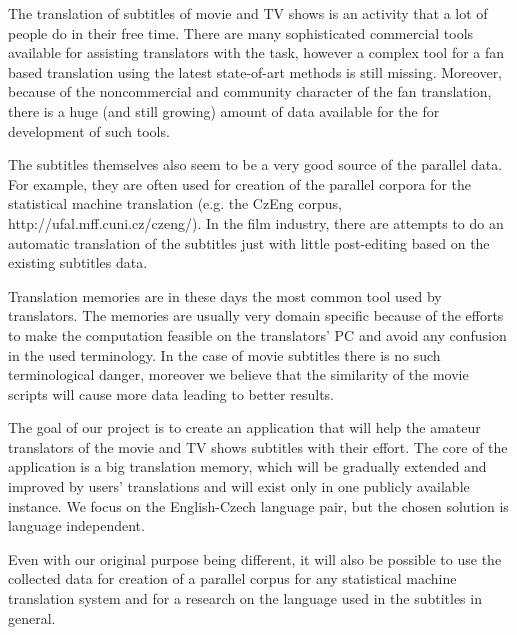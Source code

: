 
The translation of subtitles of movie and TV shows is an activity that a lot of people do in their free time. %
There are many sophisticated commercial tools available for assisting translators with the task, however a complex tool for a fan based translation using the latest state-of-art methods is still missing. 
Moreover, because of the noncommercial and community character of the fan translation, there is a huge (and still growing) amount of data available for the for development of such tools.

The subtitles themselves also seem to be a very good source of the parallel data. %
For example, they are often used for creation of the parallel corpora for the statistical machine translation (e.g. the CzEng corpus, http://ufal.mff.cuni.cz/czeng/).%
In the film industry, there are attempts to do an automatic translation of the subtitles just with little post-editing based on the existing subtitles data. %

Translation memories are in these days the most common tool used by translators. %
The memories are usually very domain specific because of the efforts to make the computation feasible on the translators' PC and avoid any confusion in the used terminology. 
In the case of movie subtitles there is no such terminological danger, moreover we believe that the similarity of the movie scripts will cause more data  leading to better results.

The goal of our project is to create an application that will help the amateur translators of the movie and TV shows subtitles with their effort.
The core of the application is a big translation memory, which will be gradually extended and improved by users' translations and will exist only in one publicly available instance. We focus on the English-Czech language pair, but the chosen solution is language independent. %


Even with our original purpose being different, it will also be possible to use the collected data for creation of a parallel corpus for any statistical machine translation system and for a research on the language used in the subtitles in general.
